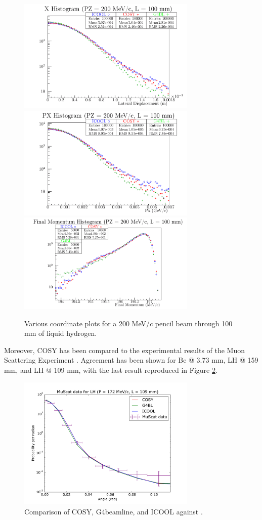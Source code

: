 \documentclass{jacow}
\begin{document}
\begin{figure}[!h]
\centering
\includegraphics*[width=85mm]{Figures/LH.X.200.100.png}
\includegraphics*[width=85mm]{Figures/LH.PX.200.100.png}
\includegraphics*[width=85mm]{Figures/LH.strag.200.100.png}
\caption{Various coordinate plots for a 200 MeV/$c$ pencil beam through 100 mm of liquid hydrogen.}
\label{fig:LH_validation}
\end{figure}

Moreover, COSY has been compared to the experimental results of the Muon Scattering Experiment \cite{muscat}. Agreement has been shown for Be @ 3.73 mm, LH @ 159 mm, and LH @ 109 mm, with the last result reproduced in Figure \ref{fig:muscat}.

\begin{figure}[!h]
\centering
\includegraphics*[width=85mm]{Figures/172.109.muscat.pdf}
\caption{Comparison of COSY, G4beamline, and ICOOL against \cite{muscat}.}
\label{fig:muscat}
\end{figure}
\end{document}
